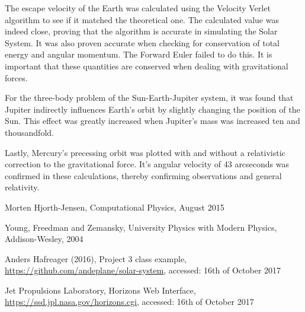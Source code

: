 \documentclass[10pt,a4paper,titlepage]{article}
\begin{document}
The escape velocity of the Earth was calculated using the Velocity Verlet algorithm to see if it matched the theoretical one. The calculated value was indeed close, proving that the algorithm is accurate in simulating the Solar System. It was also proven accurate when checking for conservation of total energy and angular momentum. The Forward Euler failed to do this. It is important that these quantities are conserved when dealing with gravitational forces. 

For the three-body problem of the Sun-Earth-Jupiter system, it was found that Jupiter indirectly influences Earth's orbit by slightly changing the position of the Sun. This effect was greatly increased when Jupiter's mass was increased ten and thousandfold. 

Lastly, Mercury's precessing orbit was plotted with and without a relativistic correction to the gravitational force. It's angular velocity of 43 arcseconds was confirmed in these calculations, thereby confirming observations and general relativity. 







\begin{flushleft}

\begin{thebibliography}{}

\singlespacing
\small




  
  Morten Hjorth-Jensen,
  Computational Physics,
  August 2015

  Young, Freedman and Zemansky,
  University Physics with Modern Physics,
  Addison-Wesley,
  2004

  Anders Hafreager (2016),
  Project 3 class example,
  \url{https://github.com/andeplane/solar-system},
  accessed: 16th of October 2017  
  
  Jet Propulsions Laboratory,
  Horizons Web Interface,
  \url{https://ssd.jpl.nasa.gov/horizons.cgi},
  accessed: 16th of October 2017
  
\end{thebibliography}
\end{flushleft}
\end{document}
